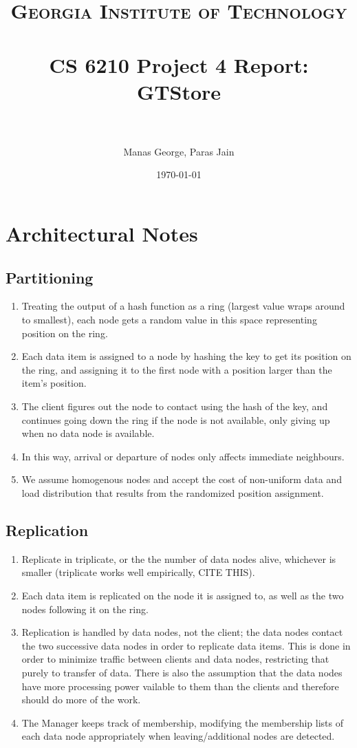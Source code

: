 \documentclass[paper=a4,fontsize=11pt]{report} %
\title{	
\normalfont \normalsize 
\textsc{Georgia Institute of Technology} \\ [25pt] %
\horrule{0.5pt} \\[0.4cm] %
\huge CS 6210 Project 4 Report: GTStore \\ %
\horrule{2pt} \\[0.5cm] %
}
\author{Manas George, Paras Jain} %
\date{\normalsize\today} %
\numberwithin{equation}{section} %
\numberwithin{figure}{section} %
\numberwithin{table}{section} %
\begin{document}
\maketitle %

\section{Architectural Notes}

\subsection{Partitioning}
\begin{enumerate}
\item Treating the output of a hash function as a ring (largest value wraps around to smallest), each node gets a random value in this space representing position on the ring.
\item Each data item is assigned to a node by hashing the key to get its position on the ring, and assigning it to the first node with a position larger than the item's position.
\item The client figures out the node to contact using the hash of the key, and continues going down the ring if the node is not available, only giving up when no data node is available.
\item In this way, arrival or departure of nodes only affects immediate neighbours.
\item We assume homogenous nodes and accept the cost of non-uniform data and load distribution that results from the randomized position assignment.
\end{enumerate}

\subsection{Replication}
\begin{enumerate}
\item Replicate in triplicate, or the the number of data nodes alive, whichever is smaller (triplicate works well empirically, CITE THIS).
\item Each data item is replicated on the node it is assigned to, as well as the two nodes following it on the ring.
\item Replication is handled by data nodes, not the client; the data nodes contact the two successive data nodes in order to replicate data items. This is done in order to minimize traffic between clients and data nodes, restricting that purely to transfer of data. There is also the assumption that the data nodes have more processing power vailable to them than the clients and therefore should do more of the work.
\item The Manager keeps track of membership, modifying the membership lists of each data node appropriately when leaving/additional nodes are detected.
\end{enumerate}
\end{document}
